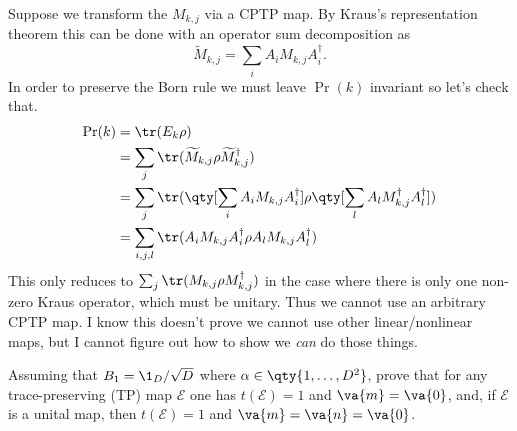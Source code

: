 \documentclass[
	pages,
	boxes,
	color=RoyalPurple
]{homework}
\makeatletter
\numberwithin{tcb@cnt@prob}{section}
\makeatother
\begin{document}
\begin{solution}
    Suppose we transform the $M_{k, j}$ via a CPTP map. By Kraus's representation theorem this can be done with an operator sum decomposition as
    \begin{equation*}
        \widetilde{M}_{k, j} = \sum_{i}A_i M_{k, j} A_i^\dagger.
    \end{equation*}
    In order to preserve the Born rule we must leave $\Pr(k)$ invariant so let's check that.
    \begin{align*}
        \Pr(k) & = \tr(E_k\rho)                                                                                         \\
               & = \sum_{j}\tr(\widetilde{M}_{k, j}\rho\widetilde{M}_{k, j}^\dagger)                                    \\
               & = \sum_{j}\tr(\qty[\sum_{i}A_i M_{k, j}A_i^\dagger]\rho\qty[\sum_{l}A_l M_{k, j}^\dagger A_l^\dagger]) \\
               & = \sum_{i, j, l}\tr(A_i M_{k, j}A_i^\dagger\rho A_l M_{k, j}A_l^\dagger)
    \end{align*}
    This only reduces to $\sum_j \tr(M_{k, j}\rho M_{k, j}^\dagger)$ in the case where there is only one non-zero Kraus operator, which must be unitary. Thus we cannot use an arbitrary CPTP map. I know this doesn't prove we cannot use other linear/nonlinear maps, but I cannot figure out how to show we \emph{can} do those things.
\end{solution}

\setcounter{section}{15}
\begin{problem}
Assuming that $B_1 = \1_D / \sqrt{D}$ where $\alpha\in\qty{1,\ldots,D^2}$, prove that for any trace-preserving (TP) map $\mathcal{E}$ one has $t(\mathcal{E}) = 1$ and $\va{m} = \va{0}$, and, if $\mathcal{E}$ is a unital map, then $t(\mathcal{E}) = 1$ and $\va{m} = \va{n} = \va{0}$.
\end{problem}
\end{document}
